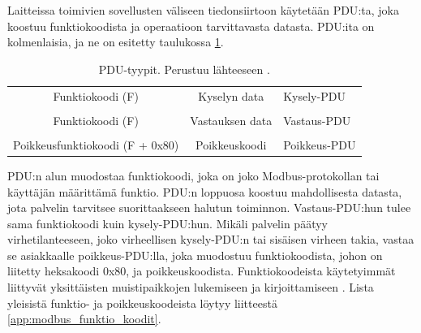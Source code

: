    Laitteissa toimivien sovellusten väliseen tiedonsiirtoon käytetään \gls{PDU}:ta, joka koostuu funktiokoodista ja operaatioon tarvittavasta datasta. \gls{PDU}:ita on kolmenlaisia, ja ne on esitetty taulukossa \ref{pdu}.
    \begin{table}[h]
      \centering
      \caption[\gls{PDU}-tyypit.]{\gls{PDU}-tyypit. Perustuu lähteeseen \parencite{modbusAppSpec}.}
      \begin{tabular}{ccl}
      \cline{1-2}
      \multicolumn{1}{|c|}{\cellcolor[HTML]{5CB735}Funktiokoodi (F)}                & \multicolumn{1}{c|}{\cellcolor[HTML]{5CB735}Kyselyn data}    & Kysely-PDU   \\ \cline{1-2}
                                                                                    &                                                              &              \\ \cline{1-2}
      \multicolumn{1}{|c|}{\cellcolor[HTML]{5CB735}Funktiokoodi (F)}                & \multicolumn{1}{c|}{\cellcolor[HTML]{5CB735}Vastauksen data} & Vastaus-PDU  \\ \cline{1-2}
                                                                                    &                                                              &              \\ \cline{1-2}
      \multicolumn{1}{|c|}{\cellcolor[HTML]{D78989}Poikkeusfunktiokoodi (F + 0x80)} & \multicolumn{1}{c|}{\cellcolor[HTML]{D78989}Poikkeuskoodi}   & Poikkeus-PDU \\ \cline{1-2}
    \end{tabular}
      \label{pdu}
    \end{table}

    \gls{PDU}:n alun muodostaa funktiokoodi, joka on joko Modbus-protokollan tai käyttäjän määrittämä funktio. PDU:n loppuosa koostuu mahdollisesta datasta, jota palvelin tarvitsee suorittaakseen halutun toiminnon. Vastaus-PDU:hun tulee sama funktiokoodi kuin kysely-PDU:hun. Mikäli palvelin päätyy virhetilanteeseen, joko virheellisen kysely-PDU:n tai sisäisen virheen takia, vastaa se asiakkaalle poikkeus-PDU:lla, joka muodostuu funktiokoodista, johon on liitetty heksakoodi 0x80, ja poikkeuskoodista. \parencite{modbusAppSpec} Funktiokoodeista käytetyimmät liittyvät yksittäisten muistipaikkojen lukemiseen ja kirjoittamiseen \parencite{DincerRosen}. Lista yleisistä funktio- ja poikkeuskoodeista löytyy liitteestä \ref{app:modbus_funktio_koodit}.



